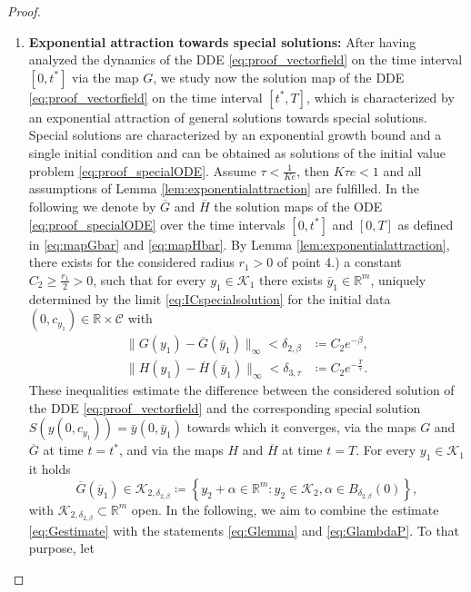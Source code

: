 \documentclass[10pt]{article}
\numberwithin{equation}{section}
\newcommand\normk[1]{\lVert#1\lVert}
\newcommand{\R}{\mathbb{R}}
\begin{document}
\begin{proof}
\begin{enumerate}
			\item  \textbf{Exponential attraction towards special solutions:} After having analyzed the dynamics of the DDE \eqref{eq:proof_vectorfield} on the time interval $[0,t^\ast]$ via the map $G$, we study now the solution map of the DDE \eqref{eq:proof_vectorfield} on the time interval $[t^\ast,T]$, which is characterized by an exponential attraction of general solutions towards special solutions. Special solutions are characterized by an exponential growth bound and a single initial condition and can be obtained as solutions of the initial value problem \eqref{eq:proof_specialODE}. Assume $\tau < \frac{1}{K e}$, then $K\tau e<1$ and all assumptions of Lemma \ref{lem:exponentialattraction} are fulfilled. In the following we denote by  $\overline{G}$ and $\overline{H}$ the solution maps of the ODE \eqref{eq:proof_specialODE} over the time intervals $[0,t^\ast]$ and $[0,T]$ as defined in \eqref{eq:mapGbar} and \eqref{eq:mapHbar}. By Lemma \ref{lem:exponentialattraction}, there exists for the considered radius $r_1>0$ of point 4.) a constant $C_2\geq \frac{r_1}{2}>0$, such that for every $y_1 \in \mathcal{K}_1$ there exists $\bar{y}_1\in \mathbb{R}^m$,  uniquely determined by the limit \eqref{eq:ICspecialsolution} for the initial data $(0,c_{y_1})\in\R\times \mathcal{C}$ with
			\begin{align}
				\normk{G(y_1)-\overline{G}(\bar{y}_1)}_\infty < \delta_{2,\beta} &\coloneqq C_2 e^{-\beta}, \label{eq:Gestimate} \\
				\normk{H(y_1)-\overline{H}(\bar{y}_1)}_\infty < \delta_{3,\tau} &\coloneqq C_2 e^{-\frac{T}{\tau}}. \label{eq:Hestimate}
			\end{align}
			These inequalities estimate the difference between the considered solution of the DDE \eqref{eq:proof_vectorfield} and the corresponding special solution $S(y(0,c_{y_1})) = \bar{y}(0,\bar{y}_1)$ towards which it converges, via the maps $G$ and $\overline{G}$  at time $t = t^\ast$, and via the maps $H$ and $\overline{H}$ at time $t = T$. For every $y_1 \in \mathcal{K}_1$ it holds
			\begin{equation*}
				\overline{G}(\overline{y}_1) \in 	\mathcal{K}_{2,\delta_{2,\beta}} \coloneqq \left\{ y_2 + \alpha \in \mathbb{R}^m: y_2 \in \mathcal{K}_2, \alpha \in B_{\delta_{2,\beta}}(0)\right\},
			\end{equation*}
			with $\mathcal{K}_{2,\delta_{2,\beta}}\subset \mathbb{R}^m$ open. In the following, we aim to combine the estimate \eqref{eq:Gestimate} with the statements \eqref{eq:Glemma} and \eqref{eq:GlambdaP}. To that purpose, let

\end{enumerate}
\end{proof}
\end{document}
